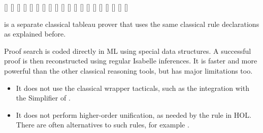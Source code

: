 \begin{isabellebody}
\begin{isamarkuptext}
\begin{railoutput}
\rail@bar
{}[]
\rail@bar
{}
[]
[]
[]
\rail@endbar
{}
\rail@bar
{}[]
[]
\rail@endbar
\rail@bar
{}
[]
[]
\rail@endbar
{}
[]
\rail@bar
\rail@bar
{}
[]
\rail@endbar
\rail@bar
{}
[]
\rail@endbar
{}
[]
\rail@endbar
{}
\rail@bar
\rail@bar
{}[]
[]
[]
\rail@endbar
\rail@bar
{}[]
[]
\rail@endbar
{}
[]
\rail@endbar
\rail@endbar
{}[]
[]
\rail@end
\end{railoutput}


  \begin{description}

  \item \hyperlink{method.blast}{\mbox{}} is a separate classical tableau prover that
  uses the same classical rule declarations as explained before.

  Proof search is coded directly in ML using special data structures.
  A successful proof is then reconstructed using regular Isabelle
  inferences.  It is faster and more powerful than the other classical
  reasoning tools, but has major limitations too.

  \begin{itemize}

  \item It does not use the classical wrapper tacticals, such as the
  integration with the Simplifier of \hyperlink{method.fastforce}{\mbox{}}.

  \item It does not perform higher-order unification, as needed by the
  rule  in HOL.  There are often
  alternatives to such rules, for example .


\end{itemize}
\end{description}
\end{isamarkuptext}
\end{isabellebody}
